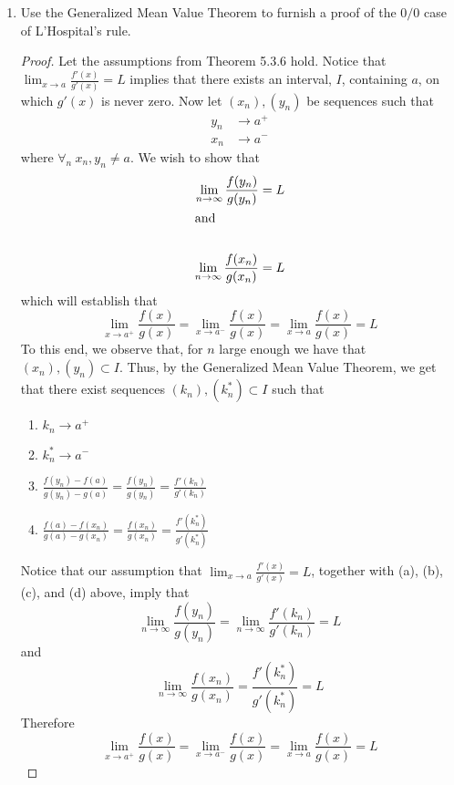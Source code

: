\begin{enumerate}
\item Use the Generalized Mean Value Theorem to furnish a proof of the \( 0/0 \) case of L'Hospital's rule.

\begin{proof}
Let the assumptions from Theorem 5.3.6 hold. Notice that \( \lim_{x \rightarrow a} \frac{f'(x)}{g'(x)} = L \) implies that there exists an interval, \( I \), containing \( a \), on which \( g'(x) \) is never zero. Now let \( (x_n), (y_n) \) be sequences such that
\begin{align*}
    y_n &\rightarrow a^+ \\
    x_n &\rightarrow a^-
\end{align*}
where \( \forall_n \: x_n, y_n \neq a \). We wish to show that 
\begin{align*}
    \lim_{n \rightarrow \infty} \frac{f(y_n)}{g(y_n)} &= L \\
    \intertext{and} \\
    \lim_{n \rightarrow \infty} \frac{f(x_n)}{g(x_n)} &= L
\end{align*}
which will establish that
\[
\lim_{x \rightarrow a^+} \frac{f(x)}{g(x)} = \lim_{x \rightarrow a^-} \frac{f(x)}{g(x)} = \lim_{x \rightarrow a} \frac{f(x)}{g(x)} = L
\]
To this end, we observe that, for \( n \) large enough we have that \( (x_n),(y_n) \subset I \). Thus, by the Generalized Mean Value Theorem, we get that there exist sequences \( (k_n), (k_n^*) \subset I \) such that
\begin{enumerate}
    \item \( k_n \rightarrow a^+ \)
    
    \item \( k_n^* \rightarrow a^- \)
    
    \item \( \frac{f(y_n)-f(a)}{g(y_n)-g(a)} = \frac{f(y_n)}{g(y_n)} = \frac{f'(k_n)}{g'(k_n)} \)
    
    \item \( \frac{f(a)-f(x_n)}{g(a)-g(x_n)} = \frac{f(x_n)}{g(x_n)} = \frac{f'(k_n^*)}{g'(k_n^*)} \)
\end{enumerate}
Notice that our assumption that \( \lim_{x \rightarrow a} \frac{f'(x)}{g'(x)} = L \), together with (a), (b), (c), and (d) above, imply that 
\[
\lim_{n \rightarrow \infty} \frac{f(y_n)}{g(y_n)} = \lim_{n \rightarrow \infty} \frac{f'(k_n)}{g'(k_n)} = L
\]
and
\[
\lim_{n \rightarrow \infty} \frac{f(x_n)}{g(x_n)} = \frac{f'(k_n^*)}{g'(k_n^*)} = L
\]
Therefore
\[
\lim_{x \rightarrow a^+} \frac{f(x)}{g(x)} = \lim_{x \rightarrow a^-} \frac{f(x)}{g(x)} = \lim_{x \rightarrow a} \frac{f(x)}{g(x)} = L
\]
\end{proof}


\end{enumerate}
